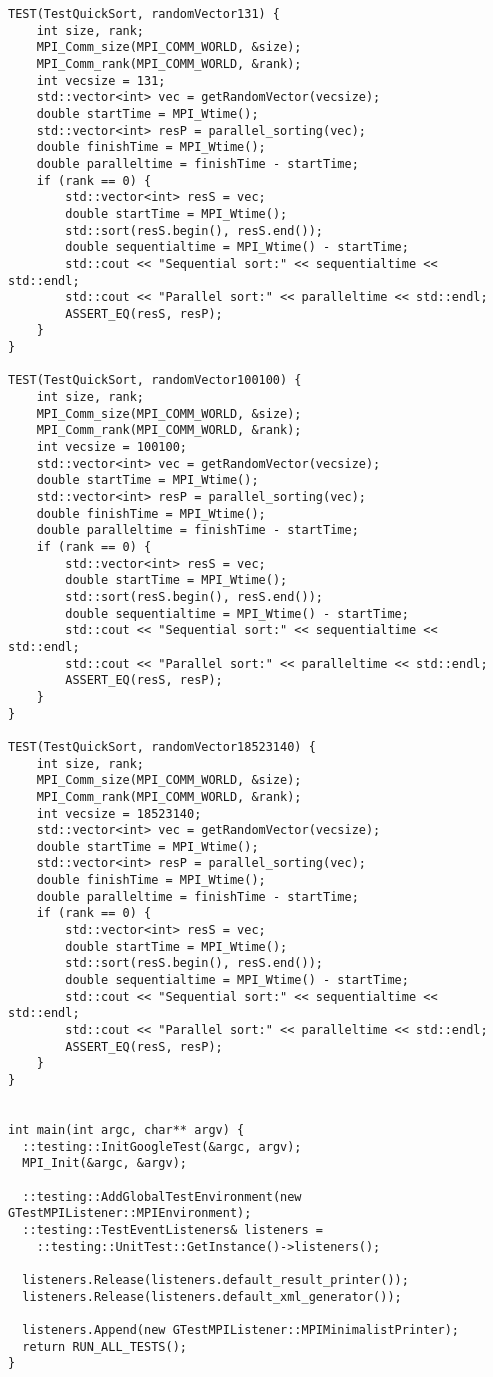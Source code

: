 \documentclass{report}
\begin{document}
\begin{lstlisting}
TEST(TestQuickSort, randomVector131) {
    int size, rank;
    MPI_Comm_size(MPI_COMM_WORLD, &size);
    MPI_Comm_rank(MPI_COMM_WORLD, &rank);
    int vecsize = 131;
    std::vector<int> vec = getRandomVector(vecsize);
    double startTime = MPI_Wtime();
    std::vector<int> resP = parallel_sorting(vec);
    double finishTime = MPI_Wtime();
    double paralleltime = finishTime - startTime;
    if (rank == 0) {
        std::vector<int> resS = vec;
        double startTime = MPI_Wtime();
        std::sort(resS.begin(), resS.end());
        double sequentialtime = MPI_Wtime() - startTime;
        std::cout << "Sequential sort:" << sequentialtime << std::endl;
        std::cout << "Parallel sort:" << paralleltime << std::endl;
        ASSERT_EQ(resS, resP);
    }
}

TEST(TestQuickSort, randomVector100100) {
    int size, rank;
    MPI_Comm_size(MPI_COMM_WORLD, &size);
    MPI_Comm_rank(MPI_COMM_WORLD, &rank);
    int vecsize = 100100;
    std::vector<int> vec = getRandomVector(vecsize);
    double startTime = MPI_Wtime();
    std::vector<int> resP = parallel_sorting(vec);
    double finishTime = MPI_Wtime();
    double paralleltime = finishTime - startTime;
    if (rank == 0) {
        std::vector<int> resS = vec;
        double startTime = MPI_Wtime();
        std::sort(resS.begin(), resS.end());
        double sequentialtime = MPI_Wtime() - startTime;
        std::cout << "Sequential sort:" << sequentialtime << std::endl;
        std::cout << "Parallel sort:" << paralleltime << std::endl;
        ASSERT_EQ(resS, resP);
    }
}

TEST(TestQuickSort, randomVector18523140) {
    int size, rank;
    MPI_Comm_size(MPI_COMM_WORLD, &size);
    MPI_Comm_rank(MPI_COMM_WORLD, &rank);
    int vecsize = 18523140;
    std::vector<int> vec = getRandomVector(vecsize);
    double startTime = MPI_Wtime();
    std::vector<int> resP = parallel_sorting(vec);
    double finishTime = MPI_Wtime();
    double paralleltime = finishTime - startTime;
    if (rank == 0) {
        std::vector<int> resS = vec;
        double startTime = MPI_Wtime();
        std::sort(resS.begin(), resS.end());
        double sequentialtime = MPI_Wtime() - startTime;
        std::cout << "Sequential sort:" << sequentialtime << std::endl;
        std::cout << "Parallel sort:" << paralleltime << std::endl;
        ASSERT_EQ(resS, resP);
    }
}


int main(int argc, char** argv) {
  ::testing::InitGoogleTest(&argc, argv);
  MPI_Init(&argc, &argv);

  ::testing::AddGlobalTestEnvironment(new GTestMPIListener::MPIEnvironment);
  ::testing::TestEventListeners& listeners =
    ::testing::UnitTest::GetInstance()->listeners();

  listeners.Release(listeners.default_result_printer());
  listeners.Release(listeners.default_xml_generator());

  listeners.Append(new GTestMPIListener::MPIMinimalistPrinter);
  return RUN_ALL_TESTS();
}


\end{lstlisting}
\end{document}
